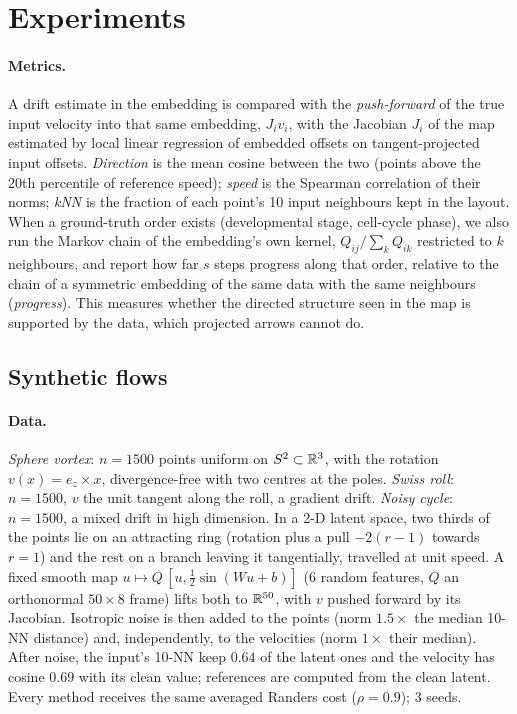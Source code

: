 \section{Experiments}
\label{sec:exp}

\paragraph{Metrics.}
A drift estimate in the embedding is compared with the \emph{push-forward}
of the true input velocity into that same embedding, $J_iv_i$, with the
Jacobian $J_i$ of the map estimated by local linear regression of embedded
offsets on tangent-projected input offsets. \emph{Direction} is the mean
cosine between the two (points above the 20th percentile of reference
speed); \emph{speed} is the Spearman correlation of their norms;
\emph{kNN} is the fraction of each point's 10 input neighbours kept in the
layout. When a ground-truth order exists (developmental stage, cell-cycle
phase), we also run the Markov chain of the embedding's own kernel,
$Q_{ij}/\sum_kQ_{ik}$ restricted to $k$ neighbours, and report how far $s$
steps progress along that order, relative to the chain of a symmetric
embedding of the same data with the same neighbours (\emph{progress}).
This measures whether the directed structure seen in the map is supported
by the data, which projected arrows cannot do.

\subsection{Synthetic flows}
\label{sec:exp_toy}

\paragraph{Data.}
\emph{Sphere vortex}: $n=1500$ points uniform on $S^2\subset\mathbb{R}^3$, with
the rotation $v(x)=e_z\times x$, divergence-free with two centres at the
poles. \emph{Swiss roll}: $n=1500$, $v$ the unit tangent along the roll, a
gradient drift. \emph{Noisy cycle}: $n=1500$, a mixed drift in high
dimension. In a 2-D latent space, two thirds of the points lie on an
attracting ring (rotation plus a pull $-2(r-1)$ towards $r=1$) and the rest
on a branch leaving it tangentially, travelled at unit speed. A fixed smooth
map $u\mapsto Q\,[u,\tfrac12\sin(Wu+b)]$ (6 random features, $Q$ an
orthonormal $50\times8$ frame) lifts both to $\mathbb{R}^{50}$, with $v$ pushed
forward by its Jacobian. Isotropic noise is then added to the points
(norm $1.5\times$ the median 10-NN distance) and, independently, to the
velocities (norm $1\times$ their median). After noise, the input's 10-NN
keep $0.64$ of the latent ones and the velocity has cosine $0.69$ with its
clean value; references are computed from the clean latent. Every method
receives the same averaged Randers cost ($\rho=0.9$); 3 seeds.

